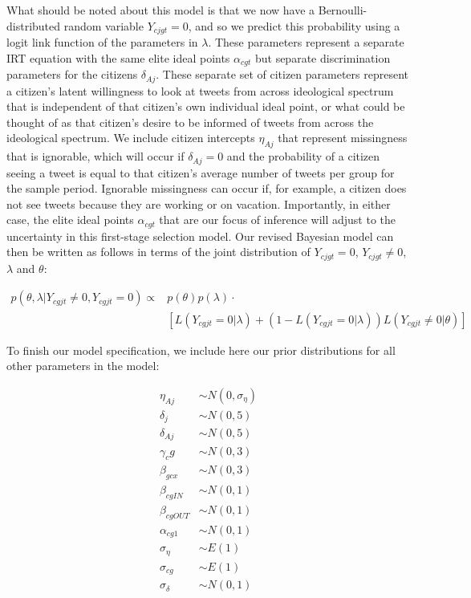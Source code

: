 \documentclass[12pt]{article}
\begin{document}
What should be noted about this model is that we now have a Bernoulli-distributed random variable $Y_{cjgt}=0$, and so we predict this probability using a logit link function of the parameters in $\lambda$. These parameters represent a separate IRT equation with the same elite ideal points $\alpha_{cgt}$ but separate discrimination parameters for the citizens $\delta_{Aj}$. These separate set of citizen parameters represent a citizen's latent willingness to look at tweets from across ideological spectrum that is independent of that citizen's own individual ideal point, or what could be thought of as that citizen's desire to be informed of tweets from across the ideological spectrum. We include citizen intercepts $\eta_{Aj}$ that represent missingness that is ignorable, which will occur if $\delta_{Aj}=0$ and the probability of a citizen seeing a tweet is equal to that citizen's average number of tweets per group for the sample period. Ignorable missingness can occur if, for example, a citizen does not see tweets because they are working or on vacation. Importantly, in either case, the elite ideal points $\alpha_{cgt}$ that are our focus of inference will adjust to the uncertainty in this first-stage selection model. Our revised Bayesian model can then be written as follows in terms of the joint distribution of $Y_{cjgt}=0$, $Y_{cjgt}\neq0$, $\lambda$ and $\theta$:

\begin{align}
p(\theta,\lambda|Y_{cgjt}\neq0,Y_{cgjt}=0) \propto& p(\theta)p(\lambda) \cdot \\
	&[ L(Y_{cgjt}=0|\lambda) + (1-L(Y_{cgjt}=0|\lambda))L(Y_{cgjt}\neq0|\theta)]
\end{align}

To finish our model specification, we include here our prior distributions for all other parameters in the model:

\begin{align}
	\eta_{Aj} &\sim N(0,\sigma_{\eta})\\
	\delta_j &\sim N(0,5) \\
	\delta_{Aj} &\sim N(0,5) \\
	\gamma_cg &\sim N(0,3)\\
	\beta_{gcx} &\sim  N(0,3)\\
	\beta_{cgIN} &\sim N(0,1)\\
	\beta_{cgOUT} &\sim N(0,1)\\ 
	\alpha_{cg1} &\sim N(0,1)\\
	\sigma_{\eta} &\sim E(1)\\
	\sigma_{cg} &\sim E(1)\\
	\sigma_{\delta} &\sim N(0,1)
\end{align}
\end{document}
